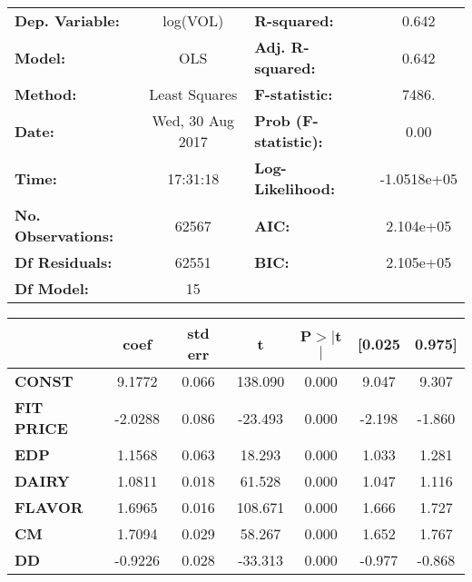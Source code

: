 \begin{center}
\begin{tabular}{lclc}
\toprule
\textbf{Dep. Variable:}    &        log(VOL)         & \textbf{  R-squared:         } &      0.642   \\
\textbf{Model:}            &       OLS        & \textbf{  Adj. R-squared:    } &      0.642   \\
\textbf{Method:}           &  Least Squares   & \textbf{  F-statistic:       } &      7486.   \\
\textbf{Date:}             & Wed, 30 Aug 2017 & \textbf{  Prob (F-statistic):} &      0.00    \\
\textbf{Time:}             &     17:31:18     & \textbf{  Log-Likelihood:    } & -1.0518e+05  \\
\textbf{No. Observations:} &       62567      & \textbf{  AIC:               } &  2.104e+05   \\
\textbf{Df Residuals:}     &       62551      & \textbf{  BIC:               } &  2.105e+05   \\
\textbf{Df Model:}         &          15      & \textbf{                     } &              \\
\bottomrule
\end{tabular}
\begin{tabular}{lcccccc}
               & \textbf{coef} & \textbf{std err} & \textbf{t} & \textbf{P$>$$|$t$|$} & \textbf{[0.025} & \textbf{0.975]}  \\
\midrule
\textbf{CONST} &       9.1772  &        0.066     &   138.090  &         0.000        &        9.047    &        9.307     \\
\textbf{FIT PRICE}    &      -2.0288  &        0.086     &   -23.493  &         0.000        &       -2.198    &       -1.860     \\
\textbf{EDP}    &       1.1568  &        0.063     &    18.293  &         0.000        &        1.033    &        1.281     \\
\textbf{DAIRY}    &       1.0811  &        0.018     &    61.528  &         0.000        &        1.047    &        1.116     \\
\textbf{FLAVOR}    &       1.6965  &        0.016     &   108.671  &         0.000        &        1.666    &        1.727     \\
\textbf{CM}    &       1.7094  &        0.029     &    58.267  &         0.000        &        1.652    &        1.767     \\
\textbf{DD}    &      -0.9226  &        0.028     &   -33.313  &         0.000        &       -0.977    &       -0.868     \\

\end{tabular}
\end{center}
